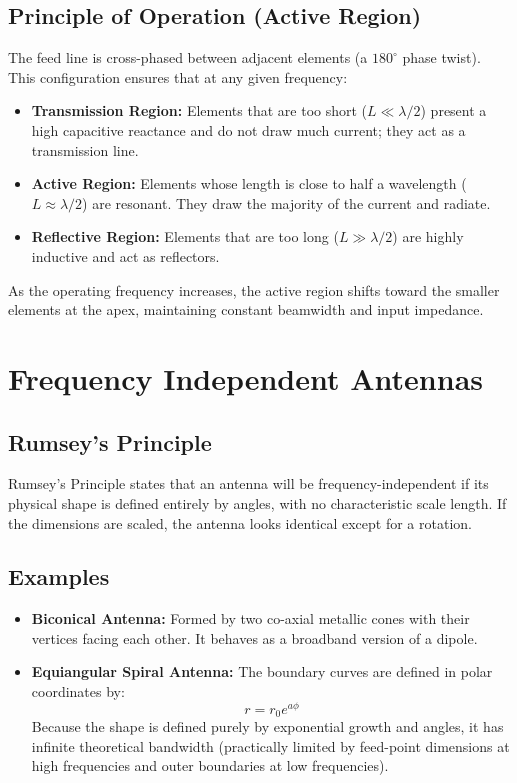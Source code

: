 \documentclass[12pt,a4paper]{article}
\begin{document}
\subsection{Principle of Operation (Active Region)}
The feed line is cross-phased between adjacent elements (a $180^\circ$ phase twist). This configuration ensures that at any given frequency:
\begin{itemize}[leftmargin=*, itemsep=3pt]
  \item \textbf{Transmission Region:} Elements that are too short ($L \ll \lambda/2$) present a high capacitive reactance and do not draw much current; they act as a transmission line.
  \item \textbf{Active Region:} Elements whose length is close to half a wavelength ($L \approx \lambda/2$) are resonant. They draw the majority of the current and radiate.
  \item \textbf{Reflective Region:} Elements that are too long ($L \gg \lambda/2$) are highly inductive and act as reflectors.
\end{itemize}
As the operating frequency increases, the active region shifts toward the smaller elements at the apex, maintaining constant beamwidth and input impedance.

\section{Frequency Independent Antennas}

\subsection{Rumsey's Principle}
Rumsey's Principle states that an antenna will be frequency-independent if its physical shape is defined entirely by angles, with no characteristic scale length. If the dimensions are scaled, the antenna looks identical except for a rotation.

\subsection{Examples}
\begin{itemize}[leftmargin=*, itemsep=3pt]
  \item \textbf{Biconical Antenna:} Formed by two co-axial metallic cones with their vertices facing each other. It behaves as a broadband version of a dipole.
  \item \textbf{Equiangular Spiral Antenna:} The boundary curves are defined in polar coordinates by:
  \[
  r = r_0 e^{a\phi}
  \]
  Because the shape is defined purely by exponential growth and angles, it has infinite theoretical bandwidth (practically limited by feed-point dimensions at high frequencies and outer boundaries at low frequencies).
\end{itemize}
\end{document}
